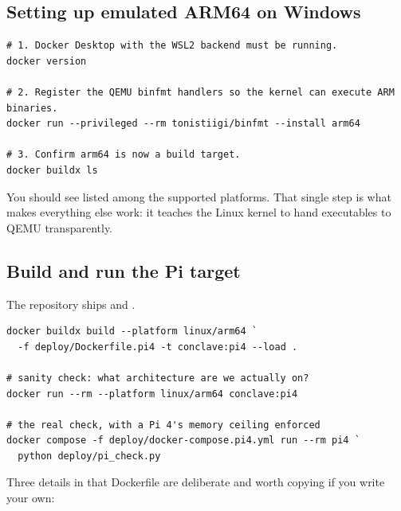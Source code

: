 \subsection{Setting up emulated ARM64 on Windows}

\begin{codebox}
\begin{lstlisting}[style=shell]
# 1. Docker Desktop with the WSL2 backend must be running.
docker version

# 2. Register the QEMU binfmt handlers so the kernel can execute ARM binaries.
docker run --privileged --rm tonistiigi/binfmt --install arm64

# 3. Confirm arm64 is now a build target.
docker buildx ls
\end{lstlisting}
\end{codebox}

\noindent You should see  listed among the supported
platforms. That single  step is what makes everything else work:
it teaches the Linux kernel to hand  executables to QEMU
transparently.

\subsection{Build and run the Pi target}

The repository ships  and
.

\begin{codebox}
\begin{lstlisting}[style=shell]
docker buildx build --platform linux/arm64 `
  -f deploy/Dockerfile.pi4 -t conclave:pi4 --load .

# sanity check: what architecture are we actually on?
docker run --rm --platform linux/arm64 conclave:pi4

# the real check, with a Pi 4's memory ceiling enforced
docker compose -f deploy/docker-compose.pi4.yml run --rm pi4 `
  python deploy/pi_check.py
\end{lstlisting}
\end{codebox}

\noindent Three details in that Dockerfile are deliberate and worth copying if
you write your own:

